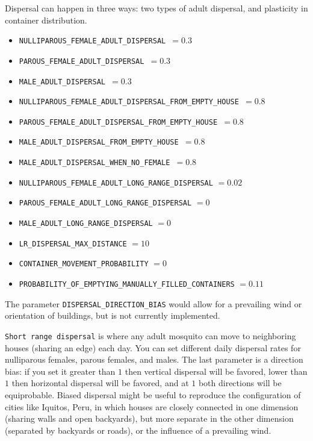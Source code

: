 \documentclass[11pt]{article}
\newcommand{\linecmd}[1]{\texttt{#1}}
\begin{document}
Dispersal can happen in three ways: two types of adult dispersal, and plasticity in container distribution.

\begin{itemize}
	\item \linecmd{NULLIPAROUS\_FEMALE\_ADULT\_DISPERSAL $=0.3$}
	\item \linecmd{PAROUS\_FEMALE\_ADULT\_DISPERSAL $=0.3$}
	\item \linecmd{MALE\_ADULT\_DISPERSAL $=0.3$}
	\item \linecmd{NULLIPAROUS\_FEMALE\_ADULT\_DISPERSAL\_FROM\_EMPTY\_HOUSE $=0.8$}
	\item \linecmd{PAROUS\_FEMALE\_ADULT\_DISPERSAL\_FROM\_EMPTY\_HOUSE $=0.8$}
	\item \linecmd{MALE\_ADULT\_DISPERSAL\_FROM\_EMPTY\_HOUSE $=0.8$}
	\item \linecmd{MALE\_ADULT\_DISPERSAL\_WHEN\_NO\_FEMALE $=0.8$}
\end{itemize}

\begin{itemize}
	\item \linecmd{NULLIPAROUS\_FEMALE\_ADULT\_LONG\_RANGE\_DISPERSAL} $=0.02$
	\item \linecmd{PAROUS\_FEMALE\_ADULT\_LONG\_RANGE\_DISPERSAL} $=0$
	\item \linecmd{MALE\_ADULT\_LONG\_RANGE\_DISPERSAL} $=0$
\end{itemize}

\begin{itemize}
	\item \linecmd{LR\_DISPERSAL\_MAX\_DISTANCE} $=10$
	\item \linecmd{CONTAINER\_MOVEMENT\_PROBABILITY} $=0$
	\item \linecmd{PROBABILITY\_OF\_EMPTYING\_MANUALLY\_FILLED\_CONTAINERS} $=0.11$
\end{itemize}

The parameter \linecmd{DISPERSAL\_DIRECTION\_BIAS} would allow for a prevailing wind or orientation of buildings, but is not currently implemented.

\bigskip{}

\linecmd{Short range dispersal} is where any adult mosquito can move to neighboring houses (sharing an edge) each day. You can set different daily dispersal rates for nulliparous females, parous females, and males. The last parameter %
is a direction bias: if you set it greater than $1$ then vertical dispersal will be favored, lower than $1$ then horizontal dispersal will be favored, and at $1$ both directions will be equiprobable. Biased dispersal might be useful to reproduce the configuration of cities like Iquitos, Peru, in which houses are closely connected in one dimension (sharing walls and open backyards), but more separate in the other dimension (separated by backyards or roads), or the influence of a prevailing wind. 
\end{document}

